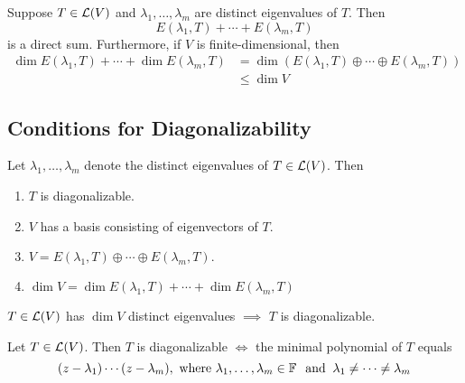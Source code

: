 \setcounter{thm}{53}
\begin{thm}
  \label{sum-of-eigenspaces-is-a-direct-sum}
  Suppose $T\in \mathcal{L} (V)$ and $\lambda_1, \dots, \lambda_m$ are distinct eigenvalues of $T$. Then
  \begin{equation}
    E(\lambda_1, T) + \cdots + E(\lambda_m, T)
  \end{equation}
  is a direct sum. Furthermore, if $V$ is finite-dimensional, then
  \begin{equation}
    \begin{aligned}
      \dim E(\lambda_1, T) + \cdots + \dim E(\lambda_m, T)
      & = \dim \left( E(\lambda_1, T)  \oplus \cdots \oplus E(\lambda_m, T) \right) \\
      & \leq \dim V
    \end{aligned}
  \end{equation}
\end{thm}

\subsection{Conditions for Diagonalizability}
\setcounter{thm}{54}
\begin{thm}
  \label{conditions-equivalent-to-diagonalizability}
  Let $\lambda_1, \dots,\lambda_m$ denote the distinct eigenvalues of $T\in \mathcal{L} (V)$. Then
  \begin{enumerate}[label=(\alph*)]
    \item $T$ is diagonalizable.
    \item $V$ has a basis consisting of eigenvectors of $T$.
    \item $V=E(\lambda_1, T) \oplus \cdots \oplus E(\lambda_m, T).$
    \item $\dim V = \dim E(\lambda_1, T) + \cdots + \dim E(\lambda_m, T)$
  \end{enumerate}
\end{thm}

\setcounter{thm}{57}
\begin{thm}
  \label{enough-eigenvalues-implies-diagonalizability}
  $T\in \mathcal{L}(V)$ has $\dim V$ distinct eigenvalues $\implies$ $T$ is diagonalizable.
\end{thm}

\setcounter{thm}{61}
\begin{thm}
  \label{necessary-and-sufficient-condition-for-diagonalizability}
  Let $T\in \mathcal{L} (V)$\footnotemark[1]. Then $T$ is diagonalizable $\iff$ the minimal polynomial of $T$ equals
  \begin{equation}
    (z-\lambda_1) \cdots (z-\lambda_m), \text{ where } \lambda_1, \dots, \lambda_m \in \mathbb{F} \;\;\, \text{and}\;\; \lambda_1 \neq \cdots \neq \lambda_m
  \end{equation}
\end{thm}

